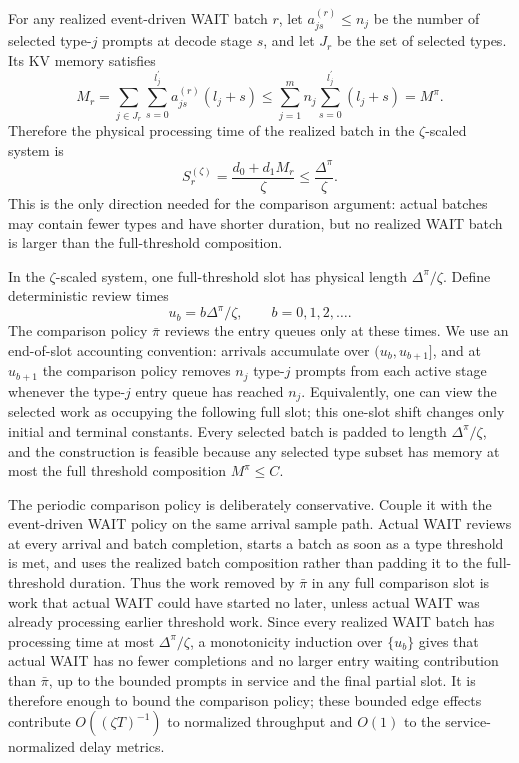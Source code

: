 For any realized event-driven WAIT batch \(r\), let \(a^{(r)}_{js}\le n_j\) be the number of selected type-\(j\) prompts at decode stage \(s\), and let \(J_r\) be the set of selected types. Its KV memory satisfies
\[
    M_r
    =
    \sum_{j\in J_r}\sum_{s=0}^{l_j^\prime} a^{(r)}_{js}(l_j+s)
    \le
    \sum_{j=1}^m n_j\sum_{s=0}^{l_j^\prime}(l_j+s)
    =
    M^\pi.
\]
Therefore the physical processing time of the realized batch in the \(\zeta\)-scaled system is
\[
    S_r^{(\zeta)}
    =
    \frac{d_0+d_1M_r}{\zeta}
    \le
    \frac{\Delta^\pi}{\zeta}.
\]
This is the only direction needed for the comparison argument: actual batches may contain fewer types and have shorter duration, but no realized WAIT batch is larger than the full-threshold composition.

In the \(\zeta\)-scaled system, one full-threshold slot has physical length \(\Delta^\pi/\zeta\). Define deterministic review times
\[
    u_b=b\Delta^\pi/\zeta,\qquad b=0,1,2,\ldots .
\]
The comparison policy \(\bar\pi\) reviews the entry queues only at these times. We use an end-of-slot accounting convention: arrivals accumulate over \((u_b,u_{b+1}]\), and at \(u_{b+1}\) the comparison policy removes \(n_j\) type-\(j\) prompts from each active stage whenever the type-\(j\) entry queue has reached \(n_j\). Equivalently, one can view the selected work as occupying the following full slot; this one-slot shift changes only initial and terminal constants. Every selected batch is padded to length \(\Delta^\pi/\zeta\), and the construction is feasible because any selected type subset has memory at most the full threshold composition \(M^\pi\le C\).

The periodic comparison policy is deliberately conservative. Couple it with the event-driven WAIT policy on the same arrival sample path. Actual WAIT reviews at every arrival and batch completion, starts a batch as soon as a type threshold is met, and uses the realized batch composition rather than padding it to the full-threshold duration. Thus the work removed by \(\bar\pi\) in any full comparison slot is work that actual WAIT could have started no later, unless actual WAIT was already processing earlier threshold work. Since every realized WAIT batch has processing time at most \(\Delta^\pi/\zeta\), a monotonicity induction over \(\{u_b\}\) gives that actual WAIT has no fewer completions and no larger entry waiting contribution than \(\bar\pi\), up to the bounded prompts in service and the final partial slot. It is therefore enough to bound the comparison policy; these bounded edge effects contribute \(O((\zeta T)^{-1})\) to normalized throughput and \(O(1)\) to the service-normalized delay metrics.

